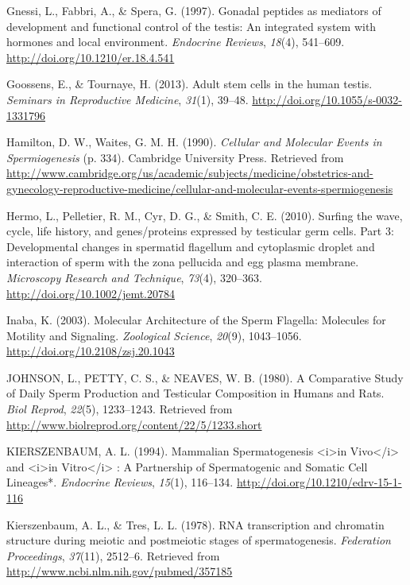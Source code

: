 \documentclass[12pt,twoside]{reedthesis}
\theoremstyle{definition}
\theoremstyle{definition}
\theoremstyle{remark}
\begin{document}
  \hypertarget{ref-Gnessi1997}{}
  Gnessi, L., Fabbri, A., \& Spera, G. (1997). Gonadal peptides as
  mediators of development and functional control of the testis: An
  integrated system with hormones and local environment. \emph{Endocrine
  Reviews}, \emph{18}(4), 541--609.
  \url{http://doi.org/10.1210/er.18.4.541}
  
  \hypertarget{ref-Goossens2013}{}
  Goossens, E., \& Tournaye, H. (2013). Adult stem cells in the human
  testis. \emph{Seminars in Reproductive Medicine}, \emph{31}(1), 39--48.
  \url{http://doi.org/10.1055/s-0032-1331796}
  
  \hypertarget{ref-Hamilton1987}{}
  Hamilton, D. W., Waites, G. M. H. (1990). \emph{Cellular and Molecular
  Events in Spermiogenesis} (p. 334). Cambridge University Press.
  Retrieved from
  \url{http://www.cambridge.org/us/academic/subjects/medicine/obstetrics-and-gynecology-reproductive-medicine/cellular-and-molecular-events-spermiogenesis}
  
  \hypertarget{ref-Hermo2010}{}
  Hermo, L., Pelletier, R. M., Cyr, D. G., \& Smith, C. E. (2010). Surfing
  the wave, cycle, life history, and genes/proteins expressed by
  testicular germ cells. Part 3: Developmental changes in spermatid
  flagellum and cytoplasmic droplet and interaction of sperm with the zona
  pellucida and egg plasma membrane. \emph{Microscopy Research and
  Technique}, \emph{73}(4), 320--363.
  \url{http://doi.org/10.1002/jemt.20784}
  
  \hypertarget{ref-Inaba2003}{}
  Inaba, K. (2003). Molecular Architecture of the Sperm Flagella:
  Molecules for Motility and Signaling. \emph{Zoological Science},
  \emph{20}(9), 1043--1056. \url{http://doi.org/10.2108/zsj.20.1043}
  
  \hypertarget{ref-Johnson1980}{}
  JOHNSON, L., PETTY, C. S., \& NEAVES, W. B. (1980). A Comparative Study
  of Daily Sperm Production and Testicular Composition in Humans and Rats.
  \emph{Biol Reprod}, \emph{22}(5), 1233--1243. Retrieved from
  \url{http://www.biolreprod.org/content/22/5/1233.short}
  
  \hypertarget{ref-KIERSZENBAUM1994}{}
  KIERSZENBAUM, A. L. (1994). Mammalian Spermatogenesis
  \textless{}i\textgreater{}in Vivo\textless{}/i\textgreater{} and
  \textless{}i\textgreater{}in Vitro\textless{}/i\textgreater{} : A
  Partnership of Spermatogenic and Somatic Cell Lineages*. \emph{Endocrine
  Reviews}, \emph{15}(1), 116--134.
  \url{http://doi.org/10.1210/edrv-15-1-116}
  
  \hypertarget{ref-Kierszenbaum1978}{}
  Kierszenbaum, A. L., \& Tres, L. L. (1978). RNA transcription and
  chromatin structure during meiotic and postmeiotic stages of
  spermatogenesis. \emph{Federation Proceedings}, \emph{37}(11), 2512--6.
  Retrieved from \url{http://www.ncbi.nlm.nih.gov/pubmed/357185}
  
\end{document}
